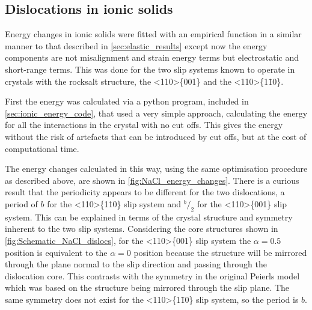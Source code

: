 \FloatBarrier
\subsection{Dislocations in ionic solids}
\FloatBarrier


Energy changes in ionic solids were fitted with an empirical function in a similar manner to that described in \autoref{sec:elastic_results} except now the energy components are not misalignment and strain energy terms but electrostatic and short-range terms. This was done for the two slip systems known to operate in crystals with the rocksalt structure, the <110>\{001\} and the <110>\{1\={1}0\}.


First the energy was calculated via a python program, included in \autoref{sec:ionic_energy_code}, that used a very simple approach, calculating the energy for all the interactions in the crystal with no cut offs. This gives the energy without the risk of artefacts that can be introduced by cut offs, but at the cost of computational time.


The energy changes calculated in this way, using the same optimisation procedure as described above, are shown in \ref{fig:NaCl_energy_changes}. There is a curious result that the periodicity appears to be different for the two dislocations, a period of $b$ for the <110>\{1\={1}0\} slip system and $^b\!/_2$ for the <110>\{001\} slip system. This can be explained in terms of the crystal structure and symmetry inherent to the two slip systems. Considering the core structures shown in \autoref{fig:Schematic_NaCl_dislocs}, for the <110>\{001\} slip system the $\alpha=0.5$ position is equivalent to the $\alpha=0$ position because the structure will be mirrored through the plane normal to the slip direction and passing through the dislocation core. This contrasts with the symmetry in the original Peierls model which was based on the structure being mirrored through the slip plane. The same symmetry does not exist for the <110>\{1\={1}0\} slip system, so the period is $b$.

